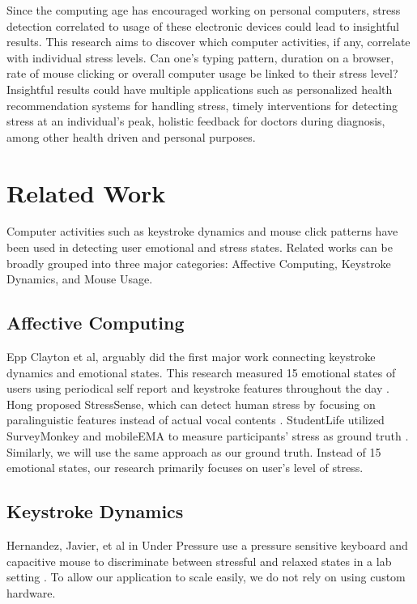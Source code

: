 \documentclass{article}
\begin{document}
Since the computing age has encouraged working on personal computers, stress detection correlated to usage of these electronic devices could lead to insightful results. This research aims to discover which computer activities, if any, correlate with individual stress levels. Can one’s typing pattern, duration on a browser, rate of mouse clicking or overall computer usage be linked to their stress level?  Insightful results could have multiple applications such as personalized health recommendation systems for handling stress, timely interventions for detecting stress at an individual’s peak, holistic feedback for doctors during diagnosis, among other health driven and personal purposes. 

\section{Related Work}
Computer activities such as keystroke dynamics and mouse click patterns have been used in detecting user emotional and stress states. Related works can be broadly grouped into three major categories: Affective Computing, Keystroke Dynamics, and Mouse Usage. 

\subsection{Affective Computing}
Epp Clayton et al, arguably did the first major work connecting keystroke dynamics and emotional states. This research measured 15 emotional states of users using periodical self report and keystroke features throughout the day \cite{epp2011identifying}. Hong proposed StressSense, which can detect human stress by focusing on  paralinguistic features instead of actual vocal contents \cite{lu2012stresssense}. StudentLife utilized SurveyMonkey and mobileEMA to measure participants’ stress as ground truth \cite{wang2014studentlife}. Similarly, we will use the same approach as our ground truth. Instead of 15 emotional states, our research primarily focuses on user's level of stress.

\subsection{Keystroke Dynamics}
Hernandez, Javier, et al in Under Pressure use a pressure sensitive keyboard and capacitive mouse to discriminate between stressful and relaxed states in a lab setting \cite{hernandez2014under}. To allow our application to scale easily, we do not rely on using custom hardware.
\end{document}
